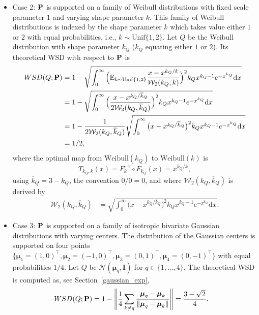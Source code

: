 \documentclass{imsart}
\numberwithin{equation}{section}
\begin{document}
\begin{itemize}
	\item Case 2: ${\bf P}$ is supported on a family of Weibull  distributions with fixed scale parameter $1$ and varying shape parameter $k$. This family of Weibull distributions is indexed by the shape parameter $k$ which takes value either $1$ or $2$ with equal probabilities, i.e., $k\sim \mathrm{Unif}\{1,2\}$. Let $Q$ be the Weibull distribution with shape parameter $k_Q$ ($k_Q$ equating either $1$ or $2$). Its theoretical WSD with respect to ${\bf P}$ is
	\begin{align*}
		{\rm WSD}(Q; {\bf P}) &= 1- \sqrt{ \int_0^\infty \Big( \mathbb{E}_{k\sim \mathrm{Unif}\{1,2\} } \frac{x-x^{k_Q/k}}{\mathcal{W}_2(k_Q, k)}  \Big)^2 k_Q x^{k_Q-1} e^{-x^{k_Q}} \mathrm{d}x}\\
		&= 1- \sqrt{ \int_0^\infty \Big( \frac{x-x^{k_Q/\overline{k}_{Q}}}{2\mathcal{W}_2(k_Q, \overline{k}_{Q})} \Big)^2  k_Q x^{k_Q-1} e^{-x^{k_Q}} \mathrm{d}x}\\
		&= 1- \frac{1}{2\mathcal{W}_2(k_Q, \overline{k}_{Q})} \sqrt{\int_0^\infty \big(x-x^{k_Q/\overline{k}_{Q}} \big)^2 k_Q x^{k_Q-1} e^{-x^{k_Q}} \mathrm{d}x} \\
		&= 1/2,
	\end{align*}
	where the optimal map from $\mathrm{Weibull}(k_Q)$ to $\mathrm{Weibull}(k)$ is 
	\begin{equation*}
		T_{k_Q, k} (x) = F_k^{-1} \circ F_{k_Q}(x) = x^{k_Q/k},
	\end{equation*}
	using $\overline{k}_{Q} = 3 - k_Q$, the convention $0/0 = 0$,
	and where $\mathcal{W}_2(k_Q, \overline{k}_{Q})$ is derived by
	\begin{align*}
		\mathcal{W}_2(k_Q, \overline{k}_{Q}) &= \sqrt{\int_0^\infty \big(x-x^{k_Q/\overline{k}_{Q}} \big)^2 k_Q x^{k_Q-1} e^{-x^{k_Q}} \mathrm{d}x} .
	\end{align*}
	
	\item Case 3: ${\bf P}$ is supported on a family of isotropic bivariate Gaussian distributions with varying centers. The distribution of the Gaussian centers is supported on four points $\{ \boldsymbol{\mu}_1=(1,0)^\top, \boldsymbol{\mu}_2=(-1,0)^\top, \boldsymbol{\mu}_3=(0,1)^\top, \boldsymbol{\mu}_4=(0,-1)^\top \}$ with equal probabilities $1/4$. Let $Q$ be  $\mathcal{N}(\boldsymbol{\mu}_q, \boldsymbol{I})$ for $q \in \{1, \ldots, 4\}$. The theoretical WSD is computed as, see Section~\ref{gaussian_exp}, 
	\begin{align*}
		{\rm WSD}(Q; {\bf P}) &= 1- \Bigg\| \frac{1}{4}\sum_{k\neq q} \frac{\boldsymbol{\mu}_q-\boldsymbol{\mu}_k}{\|\boldsymbol{\mu}_q-\boldsymbol{\mu}_k\|} \Bigg\| = \frac{3-\sqrt{2}}{4} .
	\end{align*}
	

\end{itemize}
\end{document}

